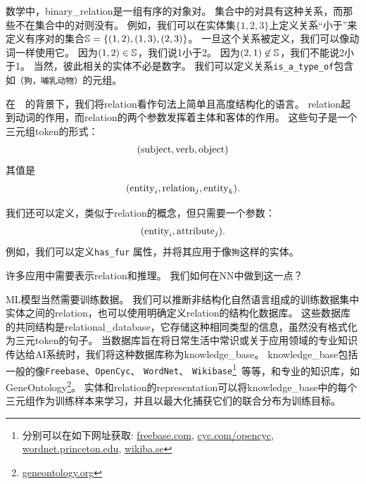 数学中，\gls{binary_relation}是一组有序的对象对。
集合中的对具有这种关系，而那些不在集合中的对则没有。
例如，我们可以在实体集$\{ 1, 2, 3 \}$上定义关系``小于''来定义有序对的集合$\mathbb{S} = \{ (1, 2), (1, 3), (2, 3) \}$。
一旦这个关系被定义，我们可以像动词一样使用它。
因为$(1, 2) \in \mathbb{S}$，我们说1小于2。
因为$(2, 1) \not \in \mathbb{S}$，我们不能说2小于1。
当然，彼此相关的实体不必是数字。
我们可以定义关系{\tt is\_a\_type\_of}包含如{\tt（狗，哺乳动物）}的元组。

在~~的背景下，我们将\gls{relation}看作句法上简单且高度结构化的语言。
\gls{relation}起到动词的作用，而\gls{relation}的两个参数发挥着主体和客体的作用。
这些句子是一个三元组\gls{token}的形式：
\begin{align}
({\rm subject}, {\rm verb}, {\rm object})
\end{align}
其值是
\begin{align}
  ({\rm entity}_i, {\rm relation}_j, {\rm entity}_k).
\end{align}

我们还可以定义，类似于\gls{relation}的概念，但只需要一个参数：
\begin{align}
  ( {\rm entity}_i, {\rm attribute}_j ).
\end{align}
例如，我们可以定义{\tt has\_fur} 属性，并将其应用于像{\tt 狗}这样的实体。

许多应用中需要表示\gls{relation}和推理。
我们如何在\gls{NN}中做到这一点？

\gls{ML}模型当然需要训练数据。
我们可以推断非结构化自然语言组成的训练数据集中实体之间的\gls{relation}，也可以使用明确定义\gls{relation}的结构化数据库。 
这些数据库的共同结构是\gls{relational_database}，它存储这种相同类型的信息，虽然没有格式化为三元\gls{token}的句子。
当数据库旨在将日常生活中常识或关于应用领域的专业知识传达给\gls{AI}系统时，我们将这种数据库称为\gls{knowledge_base}。
\gls{knowledge_base}包括一般的像{\tt Freebase}、{\tt OpenCyc}、 {\tt WordNet}、 {\tt Wikibase}\footnote{分别可以在如下网址获取: \url{freebase.com}, \url{cyc.com/opencyc},
\url{wordnet.princeton.edu}, \url{wikiba.se}}~等等，和专业的知识库，如GeneOntology\footnote{\url{geneontology.org}}。
实体和\gls{relation}的\gls{representation}可以将\gls{knowledge_base}中的每个三元组作为训练样本来学习，并且以最大化捕获它们的联合分布为训练目标\citep{Bordes-et-al-LSML2013}。

